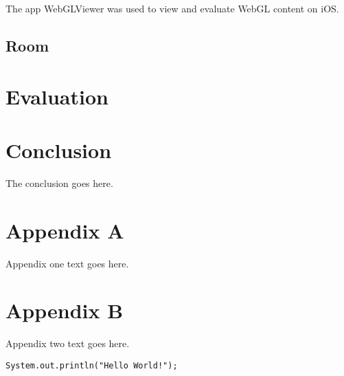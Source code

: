 \documentclass[12pt,journal,compsoc]{IEEEtran}
\begin{document}
	The app WebGLViewer was used to view and evaluate WebGL content on iOS. 

\subsection{Room}

\section{Evaluation}

\section{Conclusion}
The conclusion goes here.





\appendices
\section*{Appendix A}

Appendix one text goes here.

\section*{Appendix B}
Appendix two text goes here.

\begin{lstlisting}[label=code:hello_world, caption={Hello World Code Snippet}]
System.out.println("Hello World!");
\end{lstlisting}

\ifCLASSOPTIONcaptionsoff
  \newpage
\fi





\end{document}

